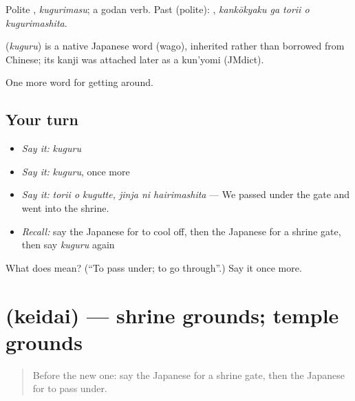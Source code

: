 Polite \textbf{}, \emph{kugurimasu}; a godan verb. Past (polite): \textbf{  }, \emph{kankōkyaku ga torii o kugurimashita}.

\begin{cousinweb}
\textbf{} (\emph{kuguru}) is a native Japanese word (wago), inherited rather than borrowed from Chinese; its kanji was attached later as a kun'yomi (JMdict).
\end{cousinweb}

\begin{grammarlens}[title={What you've built}]
One more word for getting around.
\end{grammarlens}

\subsection*{Your turn}
\begin{itemize}
\raggedright
  \item \emph{Say it:} \emph{kuguru}
  \item \emph{Say it:} \emph{kuguru}, once more
  \item \emph{Say it:} \emph{torii o kugutte, jinja ni hairimashita} — We passed under the gate and went into the shrine.
  \item \emph{Recall:} say the Japanese for to cool off, then the Japanese for a shrine gate, then say \emph{kuguru} again
\end{itemize}

\begin{tcolorbox}[breakable,colback=teal!4,colframe=teal!35!black,title={Before you move on}]
What does  mean? (\textquotedblleft{}To pass under; to go through\textquotedblright{}.) Say it once more.
\end{tcolorbox}
\section[\texorpdfstring{\ja{けいだい} (keidai)}{けいだい (keidai)}]{ (keidai) — shrine grounds; temple grounds}

\label{lesson:JA-C406-keidai}



\begin{quote}
Before the new one: say the Japanese for a shrine gate, then the Japanese for to pass under.
\end{quote}

